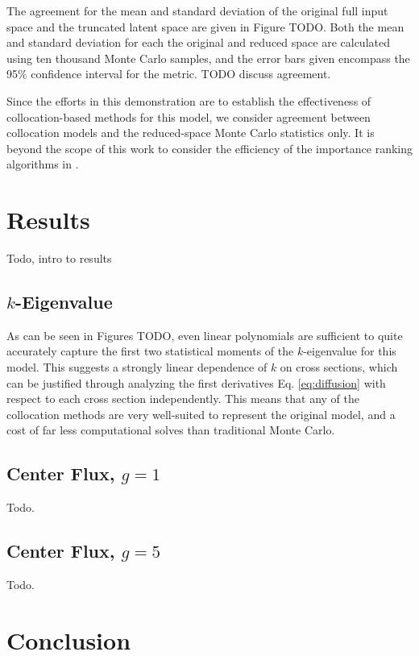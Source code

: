 The agreement for the mean and standard deviation of the original full input space and the truncated latent
space are given in Figure TODO. Both the mean and standard deviation for each the original and reduced space
are calculated using ten thousand Monte Carlo samples, and the error bars given encompass the 95\% confidence
interval for the metric.  TODO discuss agreement.

Since the efforts in this demonstration are to establish the effectiveness of collocation-based methods for
this model, we consider agreement between collocation models and the reduced-space Monte Carlo statistics only.
It is beyond the scope of this work to consider the efficiency of the importance ranking algorithms in
\raven{}.


\section{Results}
Todo, intro to results

\subsection{$k$-Eigenvalue}
As can be seen in Figures TODO, even linear polynomials are sufficient to quite accurately capture the first
two statistical moments of the $k$-eigenvalue for this model.  This suggests a strongly linear dependence of
$k$ on cross sections, which can be justified through analyzing the first derivatives Eq. \ref{eq:diffusion}
with respect to each cross section independently.  This means that any of the collocation methods are very
well-suited to represent the original model, and a cost of far less computational solves than traditional
Monte Carlo.

\subsection{Center Flux, $g=1$}
Todo.

\subsection{Center Flux, $g=5$}
Todo.

\section{Conclusion}
